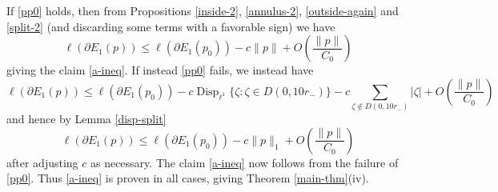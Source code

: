 \documentclass[12pt]{amsart}
\newcommand{\Disp}{\operatorname{Disp}_{\ell^1}}
\begin{document}
If \eqref{pp0} holds, then from Propositions \ref{inside-2}, \ref{annulus-2}, \ref{outside-again} and \eqref{split-2} (and discarding some terms with a favorable sign) we have
$$ \ell(\partial E_1(p)) \leq \ell(\partial E_1(p_0)) - c \|p\| + O\left(\frac{\|p\|}{C_0}\right)$$
giving the claim \eqref{a-ineq}.  If instead \eqref{pp0} fails, we instead have
$$ \ell(\partial E_1(p)) \leq \ell(\partial E_1(p_0)) - c \Disp \{ \zeta : \zeta \in D(0,10 r_-) \} - c \sum_{\zeta \notin D(0,10r_-)} |\zeta| + O\left(\frac{\|p\|}{C_0}\right)$$
and hence by Lemma \ref{disp-split}
$$ \ell(\partial E_1(p)) \leq \ell(\partial E_1(p_0)) - c \|p\|_1 + O\left(\frac{\|p\|}{C_0}\right)$$
after adjusting $c$ as necessary.  The claim \eqref{a-ineq} now follows from the failure of \eqref{pp0}.  Thus \eqref{a-ineq} is proven in all cases, giving Theorem \ref{main-thm}(iv).








\end{document}
